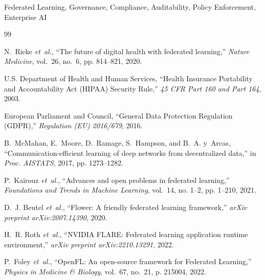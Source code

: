 \documentclass[conference]{IEEEtran}
\begin{document}
\begin{IEEEkeywords}
Federated Learning, Governance, Compliance, Auditability, Policy Enforcement, Enterprise AI
\end{IEEEkeywords}

















\begin{thebibliography}{99}

N.~Rieke \emph{et~al.}, ``The future of digital health with federated learning,'' \emph{Nature Medicine}, vol.~26, no.~6, pp. 814--821, 2020.

U.S. Department of Health and Human Services, ``Health Insurance Portability and Accountability Act (HIPAA) Security Rule,'' \emph{45 CFR Part 160 and Part 164}, 2003.

European Parliament and Council, ``General Data Protection Regulation (GDPR),'' \emph{Regulation (EU) 2016/679}, 2016.

B.~McMahan, E.~Moore, D.~Ramage, S.~Hampson, and B.~A. y~Arcas, ``Communication-efficient learning of deep networks from decentralized data,'' in \emph{Proc. AISTATS}, 2017, pp. 1273--1282.

P.~Kairouz \emph{et~al.}, ``Advances and open problems in federated learning,'' \emph{Foundations and Trends in Machine Learning}, vol.~14, no. 1--2, pp. 1--210, 2021.

D.~J. Beutel \emph{et~al.}, ``Flower: A friendly federated learning framework,'' \emph{arXiv preprint arXiv:2007.14390}, 2020.

H.~R. Roth \emph{et~al.}, ``NVIDIA FLARE: Federated learning application runtime environment,'' \emph{arXiv preprint arXiv:2210.13291}, 2022.

P.~Foley \emph{et~al.}, ``OpenFL: An open-source framework for Federated Learning,'' \emph{Physics in Medicine \& Biology}, vol.~67, no.~21, p. 215004, 2022.


\end{thebibliography}
\end{document}
